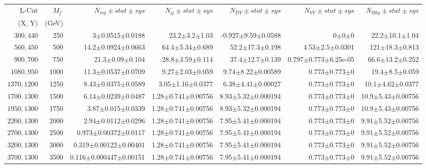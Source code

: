 \documentclass[]{article}
\begin{document}
\begin{table}
\begin{center}
\scriptsize{
\begin{tabular}{ |r|r|r|r|r|r|r|}
\hline 
L-Cut & $M_{l^*}$ & $N_{sig}\pm stat \pm sys $ &$N_{t\bar{t}}\pm stat \pm sys $ & $N_{DY}\pm stat \pm sys $ & $N_{VV}\pm stat \pm sys $ &$N_{Bkg}\pm stat \pm sys$\\
(X, Y) & (GeV) & && &&\\
\hline 
$300, 440$ & 250 & 3$\pm$0.0515$\pm$0.0188 & 23.2$\pm$3.2$\pm$1.03 & -0.927$\pm$9.59$\pm$0.0588 & 0$\pm$0$\pm$0 & 22.2$\pm$10.1$\pm$1.04 \\
$560, 450$ & 500 & 14.2$\pm$0.0924$\pm$0.0663 & 64.4$\pm$5.34$\pm$0.689 & 52.2$\pm$17.3$\pm$0.198 & 4.53$\pm$2.5$\pm$0.0301 & 121$\pm$18.3$\pm$0.813 \\
$900, 700$ & 750 & 21.3$\pm$0.09$\pm$0.104 & 28.8$\pm$3.59$\pm$0.114 & 37.4$\pm$12.7$\pm$0.139 & 0.797$\pm$0.773$\pm$6.25e-05 & 66.6$\pm$13.2$\pm$0.252 \\
$1080,950$ & 1000 & 11.3$\pm$0.0537$\pm$0.0709 & 9.27$\pm$2.03$\pm$0.059 & 9.74$\pm$8.22$\pm$0.00589 & 0.773$\pm$0.773$\pm$0 & 19.4$\pm$8.5$\pm$0.059 \\
$1370,1200$ & 1250 & 8.43$\pm$0.0375$\pm$0.0589 & 3.05$\pm$1.16$\pm$0.0377 & 6.38$\pm$4.41$\pm$0.00027 & 0.773$\pm$0.773$\pm$0 & 10.1$\pm$4.62$\pm$0.0377 \\
$1700,1300$ & 1500 & 6.14$\pm$0.0239$\pm$0.0487 & 1.28$\pm$0.741$\pm$0.00756 & 8.93$\pm$5.32$\pm$0.000194 & 0.773$\pm$0.773$\pm$0 & 10.9$\pm$5.43$\pm$0.00756 \\
$1950,1300$ & 1750 & 3.87$\pm$0.015$\pm$0.0339 & 1.28$\pm$0.741$\pm$0.00756 & 8.93$\pm$5.32$\pm$0.000194 & 0.773$\pm$0.773$\pm$0 & 10.9$\pm$5.43$\pm$0.00756 \\
$2200,1300$ & 2000 & 2.94$\pm$0.0112$\pm$0.0296 & 1.28$\pm$0.741$\pm$0.00756 & 7.95$\pm$5.41$\pm$0.000194 & 0.773$\pm$0.773$\pm$0 & 9.91$\pm$5.52$\pm$0.00756 \\
$2700,1300$ & 2500 & 0.973$\pm$0.00372$\pm$0.0117 & 1.28$\pm$0.741$\pm$0.00756 & 7.95$\pm$5.41$\pm$0.000194 & 0.773$\pm$0.773$\pm$0 & 9.91$\pm$5.52$\pm$0.00756 \\
$3200,1300$ & 3000 & 0.319$\pm$0.00122$\pm$0.00401 & 1.28$\pm$0.741$\pm$0.00756 & 7.95$\pm$5.41$\pm$0.000194 & 0.773$\pm$0.773$\pm$0 & 9.91$\pm$5.52$\pm$0.00756 \\
$3700,1300$ & 3500 & 0.116$\pm$0.000447$\pm$0.00151 & 1.28$\pm$0.741$\pm$0.00756 & 7.95$\pm$5.41$\pm$0.000194 & 0.773$\pm$0.773$\pm$0 & 9.91$\pm$5.52$\pm$0.00756 \\

\end{tabular}}
\end{center}
\end{table}
\end{document}
